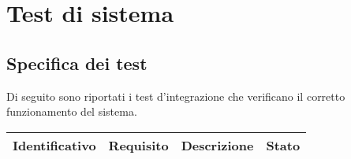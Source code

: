 \section{Test di sistema}\label{sec:test-di-sistema}
\setcounter{rowcount}{0}

\subsection{Specifica dei test}\label{subsec:specifica-dei-test-sistema}
Di seguito sono riportati i test d'integrazione che verificano il corretto funzionamento del sistema.
\begin{center}
    \begin{longtable}{ | C{2.5cm} |C{2cm} |C{7cm} |C{1.5cm}|}
        \hline
        \textbf{Identificativo} & \textbf{Requisito} & \textbf{Descrizione} & \textbf{Stato} \\\hline


\end{longtable}
\end{center}

